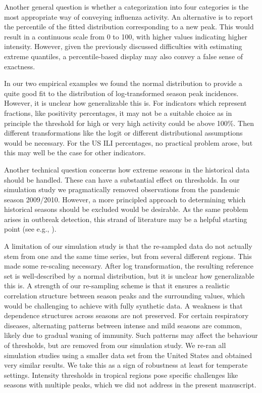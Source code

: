 \documentclass{article}
\begin{document}
Another general question is whether a categorization into four categories is the most appropriate way of conveying influenza activity. An alternative is to report the percentile of the fitted distribution corresponding to a new peak. This would result in a continuous scale from 0 to 100, with higher values indicating higher intensity. However, given the previously discussed difficulties with estimating extreme quantiles, a percentile-based display may also convey a false sense of exactness.

In our two empirical examples we found the normal distribution to provide a quite good fit to the distribution of log-transformed season peak incidences. However, it is unclear how generalizable this is. For indicators which represent fractions, like positivity percentages, it may not be a suitable choice as in principle the threshold for high or very high activity could be above 100\%. Then different transformations like the logit or different distributional assumptions would be necessary. For the US ILI percentages, no practical problem arose, but this may well be the case for other indicators.

Another technical question concerns how extreme seasons in the historical data should be handled. These can have a substantial effect on thresholds. In our simulation study we pragmatically removed observations from the pandemic season 2009/2010. However, a more principled approach to determining which historical seasons should be excluded would be desirable. As the same problem arises in outbreak detection, this strand of literature may be a helpful starting point (see e.g., \citealt{Noufaily2013}).



A limitation of our simulation study is that the re-sampled data do not actually stem from one and the same time series, but from several different regions. This made some re-scaling necessary. After log transformation, the resulting reference set is well-described by a normal distribution, but it is unclear how generalizable this is. A strength of our re-sampling scheme is that it ensures a realistic correlation structure between season peaks and the surrounding values, which would be challenging to achieve with fully synthetic data. A weakness is that dependence structures across seasons are not preserved. For certain respiratory diseases, alternating patterns between intense and mild seasons are common, likely due to gradual waning of immunity. Such patterns may affect the behaviour of thresholds, but are removed from our simulation study. We re-ran all simulation studies using a smaller data set from the United States and obtained very similar results. We take this as a sign of robustness at least for temperate settings. Intensity thresholds in tropical regions pose specific challenges like seasons with multiple peaks, which we did not address in the present manuscript.
\end{document}
